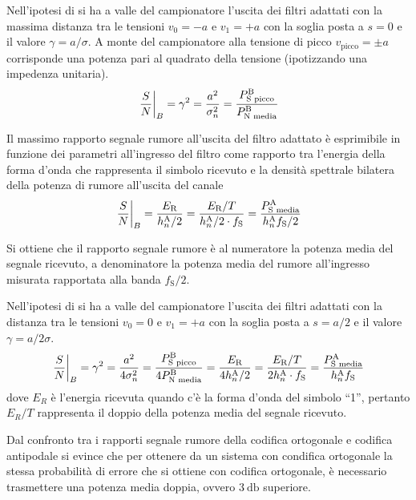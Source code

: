 Nell'ipotesi di  si ha a valle del campionatore l'uscita dei filtri adattati con la massima distanza tra le tensioni $v_0=-a$ e $v_1=+a$ con la soglia posta a $s=0$ e il valore $\gamma=a/\sigma$. A monte del campionatore alla tensione di picco $v_\text{picco}=\pm a$ corrisponde una potenza pari al quadrato della tensione (ipotizzando una impedenza unitaria).
\begin{equation}
\left.{\frac{S}{N}}\right\rvert_{B}=\gamma^2=\frac{a^2}{\sigma_n^2}=\frac{P_\text{S picco}^\text{B}}{P_\text{N media}^\text{B}}
\label{eq:rapporto_segnale_rumore_uscita_filtro_adattato}
\end{equation}

Il massimo rapporto segnale rumore all'uscita del filtro adattato è esprimibile in funzione dei parametri all'ingresso del filtro come rapporto tra l'energia della forma d'onda che rappresenta il simbolo ricevuto e la densità spettrale bilatera della potenza di rumore all'uscita del canale
\begin{equation}
\left.{\frac{S}{N}}\right\rvert_{B}=\frac{E_\text{R}}{h_n^\text{A}/2}=\frac{E_\text{R}/T}{h_n^\text{A}/2\cdot f_\text{S}}=\frac{P_\text{S media}^\text{A}}{h_n^\text{A} f_\text{S}/2}
\end{equation}

Si ottiene che il rapporto segnale rumore è al numeratore la potenza media del segnale ricevuto, a denominatore la potenza media del rumore all'ingresso misurata rapportata alla banda $f_\text{S}/2$.

Nell'ipotesi di  si ha a valle del campionatore l'uscita dei filtri adattati con la distanza tra le tensioni $v_0=0$ e $v_1=+a$ con la soglia posta a $s=a/2$ e il valore $\gamma=a/2\sigma$.
\begin{equation}
\left.{\frac{S}{N}}\right\rvert_{B}=\gamma^2=\frac{a^2}{4\sigma_n^2}=\frac{P_\text{S picco}^\text{B}}{4 P_\text{N media}^\text{B}}=\frac{E_\text{R}}{4 h_n^\text{A}/2}=\frac{E_\text{R}/T}{2 h_n^\text{A}\cdot f_\text{S}}=\frac{P_\text{S media}^\text{A}}{h_n^\text{A} f_\text{S}}
\end{equation}
dove $E_R$ è l'energia ricevuta quando c'è la forma d'onda del simbolo “1”, pertanto $E_R/T$ rappresenta il doppio della potenza media del segnale ricevuto.

Dal confronto tra i rapporti segnale rumore della codifica ortogonale e codifica antipodale si evince che per ottenere da un sistema con condifica ortogonale la stessa probabilità di errore che si ottiene con codifica ortogonale, è necessario trasmettere una potenza media doppia, ovvero $\SI{3}{\decibel}$ superiore.

